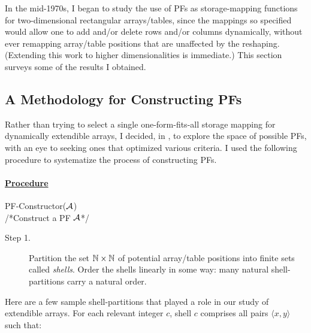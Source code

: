 In the mid-1970s, I began to study the use of PFs as storage-mapping
functions for two-dimensional rectangular arrays/tables, since the
mappings so specified would allow one to add and/or delete rows and/or
columns dynamically, without ever remapping array/table positions that
are unaffected by the reshaping.  (Extending this work to higher
dimensionalities is immediate.)  This section surveys some of the
results I obtained.

\subsection{A Methodology for Constructing PFs}

Rather than trying to select a single one-form-fits-all storage
mapping for dynamically extendible arrays, I decided, in
\cite{Rosenberg74}, to explore the space of possible PFs, with an eye
to seeking ones that optimized various criteria.  I used the following
procedure to systematize the process of constructing PFs.

\paragraph{\underline{Procedure}} {\sf PF-Constructor}($\mbox{$\cal A$}$) \\
/*Construct a PF $\mbox{$\cal A$}$*/
\begin{description}
\item[Step 1.]
Partition the set $\mathbb{N} \times \mathbb{N}$ of potential array/table positions
into finite sets called {\it shells}.  Order the shells linearly in
some way: many natural shell-partitions carry a natural order.
\end{description}

Here are a few sample shell-partitions that played a role in our study
of extendible arrays.  For each relevant integer $c$, shell $c$
comprises all pairs $\langle x,y \rangle$ such that:


